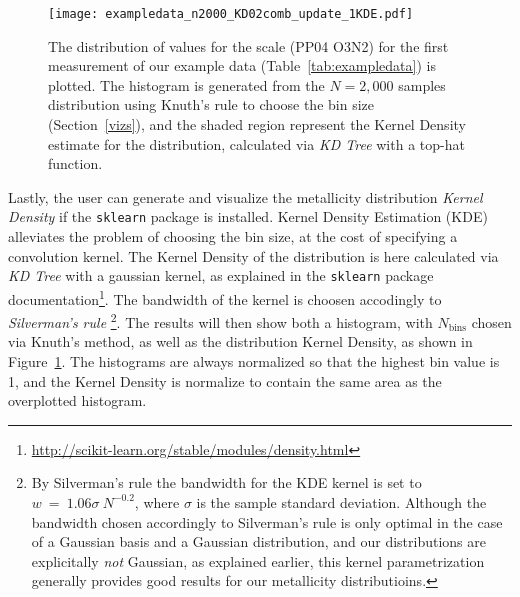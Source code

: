 \documentclass{emulateapj}
\begin{document}
\begin{figure}[ht!]
  \texttt{[image: exampledata\_n2000\_KD02comb\_update\_1KDE.pdf]}
   \caption{The distribution of values for the \citet{pettini04} scale (PP04 O3N2) for the first measurement of our example data (Table~\ref{tab:exampledata}) is plotted. The histogram is generated from the $N=2,000$ samples distribution using Knuth's rule to choose the bin size (Section~\ref{vizs}), and the shaded region represent the Kernel Density estimate for the distribution, calculated via \emph{KD Tree} with a top-hat function. }
\label{fig:KDE}
\end{figure}
Lastly, the user can generate and visualize the metallicity distribution \emph{Kernel Density} if the \verb=sklearn= package is installed. Kernel Density Estimation (KDE) alleviates the problem of choosing the bin size, at the cost of specifying a convolution kernel. The Kernel Density of the distribution is here calculated via  \emph{KD Tree} with a gaussian kernel, as explained in the \verb=sklearn= package documentation\footnote{\url{http://scikit-learn.org/stable/modules/density.html}}. The bandwidth of the kernel is choosen accodingly to \emph{Silverman's rule} \citep{silverman86}\footnote{By Silverman's rule the bandwidth for the KDE kernel is set to $w~=~1.06\sigma~N^{-0.2}$, where $\sigma$ is the sample standard deviation. Although the bandwidth chosen accordingly to Silverman's rule is only optimal in the case of a Gaussian basis and a Gaussian distribution, and our distributions are explicitally \emph{not} Gaussian, as explained earlier, this kernel parametrization generally provides good results for our metallicity distributioins.}. The results will then show both a histogram, with $N_\mathrm{bins}$ chosen via Knuth's method, as well as the distribution Kernel Density, as shown in Figure~\ref{fig:KDE}. The histograms are always normalized so that the highest bin value is 1, and the  Kernel Density is normalize to contain the same area as the overplotted histogram. %
\end{document}
